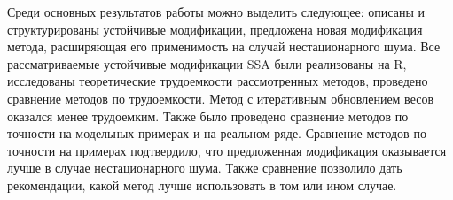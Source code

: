 \documentclass[10pt, ucs, notheorems, handout]{beamer}
\begin{document}
\begin{frame}
{	Среди основных результатов работы можно выделить следующее: описаны и структурированы устойчивые модификации, предложена новая модификация метода, расширяющая его применимость на случай нестационарного шума. Все рассматриваемые устойчивые модификации SSA были реализованы на R, исследованы теоретические трудоемкости рассмотренных методов, проведено сравнение методов по трудоемкости. Метод с итеративным обновлением весов оказался менее трудоемким. Также было проведено сравнение методов по точности на модельных примерах и на реальном ряде. Сравнение методов по точности на примерах подтвердило, что предложенная модификация оказывается лучше в случае нестационарного шума. Также сравнение позволило дать рекомендации, какой метод лучше использовать в том или ином случае.
	
	
}
\end{frame}
\end{document}
